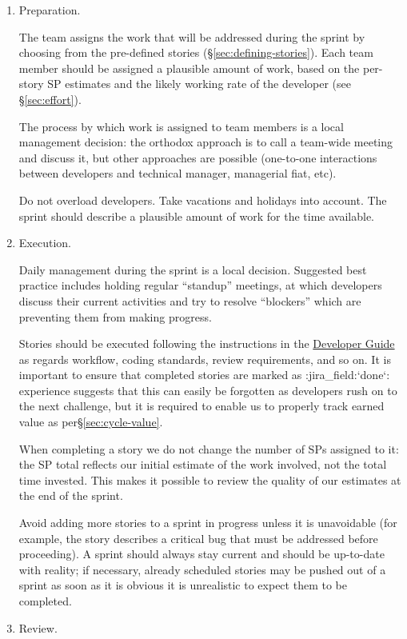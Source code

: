 \begin{enumerate}
\item
  Preparation.

  The team assigns the work that will be addressed during the sprint by choosing from the pre-defined stories (\S\ref{sec:defining-stories}).
  Each team member should be assigned a plausible amount of work, based on the per-story SP estimates and the likely working rate of the developer (see \S\ref{sec:effort}).

  The process by which work is assigned to team members is a local
  management decision: the orthodox approach is to call a team-wide
  meeting and discuss it, but other approaches are possible (one-to-one
  interactions between developers and technical manager, managerial
  fiat, etc).

  Do not overload developers. Take vacations and holidays into account.
  The sprint should describe a plausible amount of work for the time
  available.
\item
  Execution.

  Daily management during the sprint is a local decision. Suggested best
  practice includes holding regular ``standup'' meetings, at which
  developers discuss their current activities and try to resolve
  ``blockers'' which are preventing them from making progress.

  Stories should be executed following the instructions in the
  \href{http://developer.lsst.io/}{Developer Guide} as regards workflow,
  coding standards, review requirements, and so on. It is important to
  ensure that completed stories are marked as :jira\_field:`done`:
  experience suggests that this can easily be forgotten as developers
  rush on to the next challenge, but it is required to enable us to
  properly track earned value as per\S\ref{sec:cycle-value}.

  When completing a story we do not change the number of SPs assigned to
  it: the SP total reflects our initial estimate of the work involved,
  not the total time invested. This makes it possible to review the
  quality of our estimates at the end of the sprint.

  Avoid adding more stories to a sprint in progress unless it is
  unavoidable (for example, the story describes a critical bug that must
  be addressed before proceeding). A sprint should always stay current
  and should be up-to-date with reality; if necessary, already scheduled
  stories may be pushed out of a sprint as soon as it is obvious it is
  unrealistic to expect them to be completed.
\item
  Review.


\end{enumerate}
